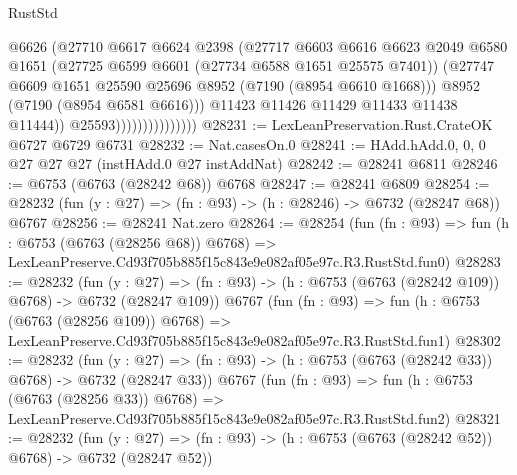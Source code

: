 \begin{lexlean}{RustStd}
\begin{coremodule}
                                    @6626
                                    (@27710
                                      @6617
                                      @6624
                                      @2398
                                      (@27717
                                        @6603
                                        @6616
                                        @6623
                                        @2049
                                        @6580
                                        @1651
                                        (@27725 @6599 @6601 (@27734 @6588 @1651 @25575 @7401))
                                        (@27747
                                          @6609
                                          @1651
                                          @25590
                                          @25696
                                          @8952
                                          (@7190 (@8954 @6610 @1668)))
                                        @8952
                                        (@7190 (@8954 @6581 @6616)))
                                      @11423
                                      @11426
                                      @11429
                                      @11433
                                      @11438
                                      @11444))
                                  @25593)))))))))))))))
@28231 := LexLeanPreservation.Rust.CrateOK @6727 @6729 @6731
@28232 := Nat.casesOn.{0}
@28241 := HAdd.hAdd.{0, 0, 0} @27 @27 @27 (instHAdd.{0} @27 instAddNat)
@28242 := @28241 @6811
@28246 := @6753 (@6763 (@28242 @68)) @6768
@28247 := @28241 @6809
@28254 := @28232 (fun (y : @27) => (fn : @93) -> (h : @28246) -> @6732 (@28247 @68)) @6767
@28256 := @28241 Nat.zero
@28264 := @28254
    (fun (fn : @93) =>
    fun (h : @6753 (@6763 (@28256 @68)) @6768) =>
    LexLeanPreserve.Cd93f705b885f15c843e9e082af05e97c.R3.RustStd.fun0)
@28283 := @28232
    (fun (y : @27) => (fn : @93) -> (h : @6753 (@6763 (@28242 @109)) @6768) -> @6732 (@28247 @109))
    @6767
    (fun (fn : @93) =>
    fun (h : @6753 (@6763 (@28256 @109)) @6768) =>
    LexLeanPreserve.Cd93f705b885f15c843e9e082af05e97c.R3.RustStd.fun1)
@28302 := @28232
    (fun (y : @27) => (fn : @93) -> (h : @6753 (@6763 (@28242 @33)) @6768) -> @6732 (@28247 @33))
    @6767
    (fun (fn : @93) =>
    fun (h : @6753 (@6763 (@28256 @33)) @6768) =>
    LexLeanPreserve.Cd93f705b885f15c843e9e082af05e97c.R3.RustStd.fun2)
@28321 := @28232
    (fun (y : @27) => (fn : @93) -> (h : @6753 (@6763 (@28242 @52)) @6768) -> @6732 (@28247 @52))

\end{coremodule}
\end{lexlean}
